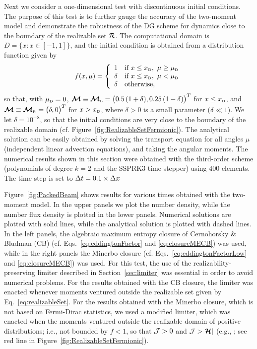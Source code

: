 Next we consider a one-dimensional test with discontinuous initial conditions.  
The purpose of this test is to further gauge the accuracy of the two-moment model and demonstrate the robustness of the DG scheme for dynamics close to the boundary of the realizable set $\mathcal{R}$.  
The computational domain is $D=\{x:x\in[-1,1]\}$, and the initial condition is obtained from a distribution function given by
\begin{equation}
  f(x,\mu)
  =\left\{
  \begin{array}{cl}
    1        & \text{if} ~ x\le x_{\mbox{\tiny D}}, ~ \mu\ge\mu_{\mbox{\tiny D}} \\
    \delta & \text{if} ~ x\le x_{\mbox{\tiny D}}, ~ \mu<   \mu_{\mbox{\tiny D}} \\
    \delta & \text{otherwise},
  \end{array}
  \right.
\end{equation}
so that, with $\mu_{\mbox{\tiny D}}=0$, $\boldsymbol{\mathcal{M}}\equiv\boldsymbol{\mathcal{M}}_{\mbox{\tiny L}}=\big(0.5\,(1+\delta),0.25\,(1-\delta)\big)^{T}$ for $x\le x_{\mbox{\tiny D}}$, and $\boldsymbol{\mathcal{M}}\equiv\boldsymbol{\mathcal{M}}_{\mbox{\tiny R}}=\big(\delta,0\big)^{T}$ for $x> x_{\mbox{\tiny D}}$, where $\delta>0$ is a small parameter ($\delta\ll1$).  
We let $\delta=10^{-8}$, so that the initial conditions are very close to the boundary of the realizable domain (cf. Figure~\ref{fig:RealizableSetFermionic}).  
The analytical solution can be easily obtained by solving the transport equation for all angles $\mu$ (independent linear advection equations), and taking the angular moments.  
The numerical results shown in this section were obtained with the third-order scheme (polynomials of degree $k=2$ and the SSPRK3 time stepper) using $400$ elements.  
The time step is set to $\Delta t=0.1\times\Delta x$

Figure~\ref{fig:PackedBeam} shows results for various times obtained with the two-moment model.  
In the upper panels we plot the number density, while the number flux density is plotted in the lower panels.  
Numerical solutions are plotted with solid lines, while the analytical solution is plotted with dashed lines.  
In the left panels, the algebraic maximum entropy closure of Cernohorsky \& Bludman (CB) \cite{cernohorskyBludman_1994} (cf. Eqs.~\eqref{eq:eddingtonFactor} and \eqref{eq:closureMECB}) was used, while in the right panels the Minerbo closure (cf. Eqs.~\eqref{eq:eddingtonFactorLow} and \eqref{eq:closureMECB}) was used.  
For this test, the use of the realizability-preserving limiter described in Section~\ref{sec:limiter} was essential in order to avoid numerical problems.  
For the results obtained with the CB closure, the limiter was enacted whenever moments ventured outside the realizable set given by Eq.~\eqref{eq:realizableSet}.  
For the results obtained with the Minerbo closure, which is not based on Fermi-Dirac statistics, we used a modified limiter, which was enacted when the moments ventured outside the realizable domain of positive distributions; i.e., not bounded by $f < 1$, so that $\mathcal{J} > 0$ and $\mathcal{J} > \boldsymbol{\mathcal{H}}|$ (e.g., \cite{levermore_1984}; see red line in Figure~\ref{fig:RealizableSetFermionic}).  

